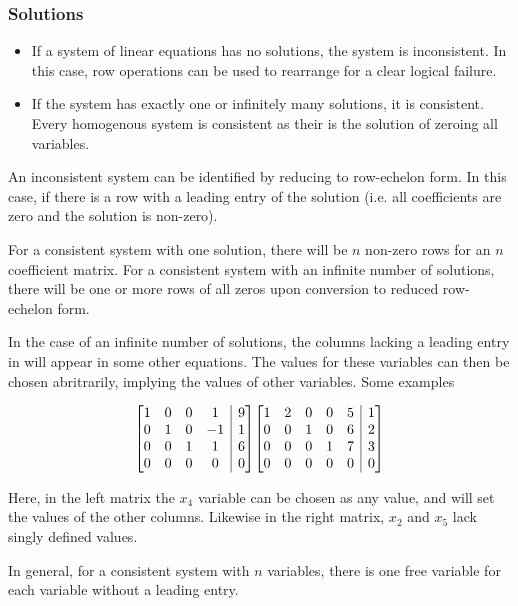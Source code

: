 \documentclass[12pt]{report}
\makeatletter
\newenvironment{amatrix}[1]{
    \left[\begin{array}{@{}*{#1}{c}|c@{}}
}{
    \end{array}\right]
}
\makeatother
\begin{document}
\begin{flushleft}
\subsubsection*{Solutions}

\begin{itemize}
    \item If a system of linear equations has no solutions, the system is
        inconsistent. In this case, row operations can be used to rearrange for a
        clear logical failure.
    \item If the system has exactly one or infinitely many solutions, it is
        consistent. Every homogenous system is consistent as their is the
        solution of zeroing all variables.
\end{itemize}

An inconsistent system can be identified by reducing to row-echelon form. In
this case, if there is a row with a leading entry of the solution (i.e. all
coefficients are zero and the solution is non-zero). \par
For a consistent system with one solution, there will be \(n\) non-zero rows for
an \(n\) coefficient matrix. For a consistent system with an infinite number of
solutions, there will be one or more rows of all zeros upon conversion to
reduced row-echelon form. \par
In the case of an infinite number of solutions, the columns lacking a leading
entry in will appear in some other equations. The values for these
variables can then be chosen abritrarily, implying the values of other
variables. Some examples

\[
    \begin{amatrix}{4}
        1 & 0 & 0 & 1 & 9 \\
        0 & 1 & 0 & -1 & 1 \\
        0 & 0 & 1 & 1 & 6 \\
        0 & 0 & 0 & 0 & 0 \\
    \end{amatrix}
    \begin{amatrix}{5}
        1 & 2 & 0 & 0 & 5 & 1 \\
        0 & 0 & 1 & 0 & 6 & 2 \\
        0 & 0 & 0 & 1 & 7 & 3 \\
        0 & 0 & 0 & 0 & 0 & 0 \\
    \end{amatrix}
\]

Here, in the left matrix the \(x_4\) variable can be chosen as any value, and
will set the values of the other columns. Likewise in the right matrix, \(x_2\)
and \(x_5\) lack singly defined values. \par
In general, for a consistent system with \(n\) variables, there is one free
variable for each variable without a leading entry.

\end{flushleft}
\end{document}
